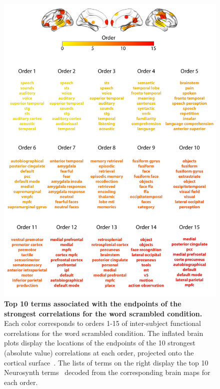 \documentclass{article}
\begin{document}
\begin{figure}[p!]
\centering
\includegraphics[width=\textwidth]{figs/supp_15_word}
\caption{\small \textbf{Top 10 terms associated with the endpoints of the
      strongest correlations for the word scrambled condition.}  Each color corresponds to orders 1-15 of
    inter-subject functional correlations for the word scrambled condition. The inflated brain plots
    display the locations of the endpoints of the 10 strongest
    (absolute value) correlations at each order, projected onto the
    cortical surface~\citep{CombEtal19}.  The lists of terms on the
    right display the top 10 Neurosynth terms~\citep{RubiEtal17}
    decoded from the corresponding brain maps for each order.}
\label{fig:word}
\end{figure}
\end{document}

